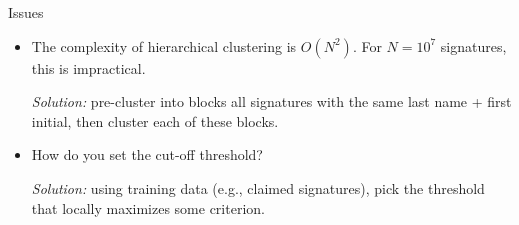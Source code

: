 \documentclass{beamer}
\begin{document}
\begin{frame}{Issues}

\begin{itemize}
\item The complexity of hierarchical clustering is {\color{red} $O(N^2)$}. For $N=10^7$ signatures, this is impractical.

{\it Solution:} pre-cluster into blocks all signatures with the same last name + first initial, then cluster each of these blocks.\\[2em]

\item How do you set the {\color{red} cut-off threshold}?

{\it Solution:} using training data (e.g., claimed signatures), pick the threshold that locally maximizes some criterion.
\end{itemize}

\end{frame}

\end{document}
